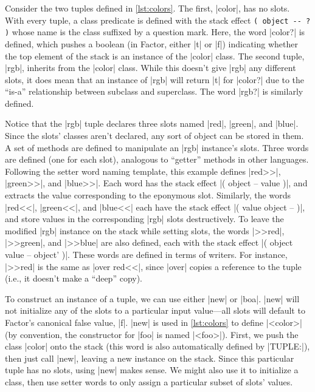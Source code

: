 
Consider the two tuples defined in \cref{lst:colors}.  The first,
\factor|color|, has no slots.  With every tuple, a class predicate is defined
with the stack effect
%
\verb|( object -- ? )|
%
whose name is the class suffixed by a question mark.  Here, the word
\factor|color?| is defined, which pushes a boolean (in Factor, either
\factor|t| or \factor|f|) indicating whether the top element of the stack is an
instance of the \factor|color| class.  The second tuple, \factor|rgb|, inherits
from the \factor|color| class.  While this doesn't give \factor|rgb| any
different slots, it does mean that an instance of \factor|rgb| will return
\factor|t| for \factor|color?| due to the ``is-a'' relationship between
subclass and superclass.  The word \factor|rgb?| is similarly defined.

Notice that the \factor|rgb| tuple declares three slots named \factor|red|,
\factor|green|, and \factor|blue|.  Since the slots' classes aren't declared,
any sort of object can be stored in them.  A set of methods are defined to
manipulate an \factor|rgb| instance's slots.  Three  words are
defined (one for each slot), analogous to ``getter'' methods in other
languages.  Following the setter word naming template, this example defines
\factor|red>>|, \factor|green>>|, and \factor|blue>>|.  Each word has the stack
effect
%
\factor|( object -- value )|,
%
and extracts the value corresponding to the eponymous slot.  Similarly, the
 words \factor|red<<|, \factor|green<<|, and \factor|blue<<| each
have the stack effect
%
\factor|( value object -- )|,
%
and store values in the corresponding \factor|rgb| slots destructively.  To
leave the modified \factor|rgb| instance on the stack while setting slots, the
 words \factor|>>red|, \factor|>>green|, and \factor|>>blue| are
also defined, each with the stack effect
%
\factor|( object value -- object' )|.
%
These words are defined in terms of writers.  For instance, \factor|>>red| is
the same as \factor|over red<<|, since \factor|over| copies a reference to the
tuple (i.e., it doesn't make a ``deep'' copy).

To construct an instance of a tuple, we can use either \factor|new| or
\factor|boa|.  \factor|new| will not initialize any of the slots to a
particular input value---all slots will default to Factor's canonical false
value, \factor|f|.  \factor|new| is used in \cref{lst:colors} to define
\factor|<color>| (by convention, the constructor for \factor|foo| is named
\factor|<foo>|).  First, we push the class \factor|color| onto the stack (this
word is also automatically defined by \factor|TUPLE:|), then just call
\factor|new|, leaving a new instance on the stack.  Since this particular tuple
has no slots, using \factor|new| makes sense.  We might also use it to
initialize a class, then use setter words to only assign a particular subset of
slots' values.

